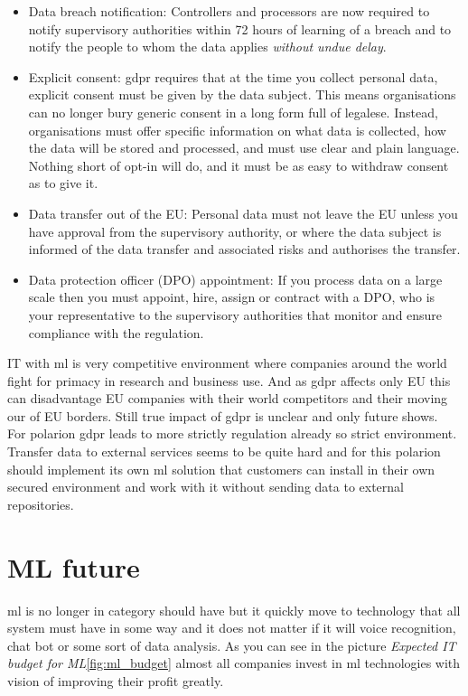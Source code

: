 \documentclass[thesis=M,english]{FITthesis}[2012/06/26]
\begin{document}
\begin{itemize}[nosep]
\item Data breach notification: Controllers and processors are now required to notify supervisory authorities within 72 hours of learning of a breach and to notify the people to whom the data applies \textit{without undue delay}. 
\item Explicit consent: \acrshort{gdpr} requires that at the time you collect personal data, explicit consent must be given by the data subject. This means organisations can no longer bury generic consent in a long form full of legalese. Instead, organisations must offer specific information on what data is collected, how the data will be stored and processed, and must use clear and plain language. Nothing short of opt-in will do, and it must be as easy to withdraw consent as to give it. 
\item Data transfer out of the EU: Personal data must not leave the EU unless you have approval from the supervisory authority, or where the data subject is informed of the data transfer and associated risks and authorises the transfer. 
\item Data protection officer (DPO) appointment: If you process data on a large scale then you must appoint, hire, assign or contract with a DPO, who is your representative to the supervisory authorities that monitor and ensure compliance with the regulation.\\
\end{itemize}

IT with \acrshort{ml} is very competitive environment where companies around the world fight for primacy in research and business use. And as \acrshort{gdpr} affects only EU this can disadvantage EU companies with their world competitors and their moving our of EU borders. Still true impact of \acrshort{gdpr} is unclear and only future shows.\\

For \acrfull{polarion} \acrshort{gdpr} leads to more strictly regulation already so strict environment. Transfer data to external services seems to be quite hard and for this \acrshort{polarion} should implement its own \acrshort{ml} solution that customers can install in their own secured environment and work with it without sending data to external repositories.

\section{ML future}
\acrshort{ml} is no longer in category should have but it quickly move to technology that all system must have in some way and it does not matter if it will voice recognition, chat bot or some sort of data analysis. As you can see in the picture \textit{Expected IT budget for ML}\ref{fig:ml_budget} almost all companies invest in \acrshort{ml} technologies with vision of improving their profit greatly.\\
\end{document}
